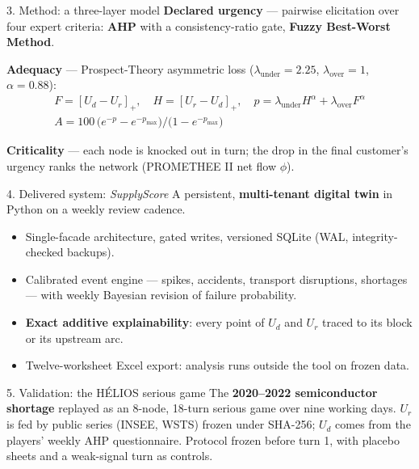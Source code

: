 \documentclass[20pt]{extarticle}
\newcommand{\hl}[1]{\textcolor{altenazure}{\bfseries #1}}
\newcommand{\gap}{\vspace{4mm}}
\begin{document}
\begin{minipage}[t][\textheight][t]{\textwidth}
\begin{minipage}[t]{0.489\linewidth}
\begin{pbox}{3. Method: a three-layer model}
\smallskip
\textbf{Declared urgency} — pairwise elicitation over four expert criteria:
\hl{AHP} with a consistency-ratio gate, \hl{Fuzzy Best-Worst Method}.

\smallskip
\textbf{Adequacy} — Prospect-Theory asymmetric loss
($\lambda_{\text{under}}\!=\!2.25$, $\lambda_{\text{over}}\!=\!1$, $\alpha\!=\!0.88$):
\begin{gather*}
  F=[U_d-U_r]_+,\quad H=[U_r-U_d]_+,\quad
  p=\lambda_{\text{under}}H^{\alpha}+\lambda_{\text{over}}F^{\alpha}\\
  A = 100\,\bigl(e^{-p}-e^{-p_{\max}}\bigr)\big/\bigl(1-e^{-p_{\max}}\bigr)
\end{gather*}

\smallskip
\textbf{Criticality} — each node is knocked out in turn; the drop in the final
customer's urgency ranks the network (PROMETHEE II net flow $\phi$).
\end{pbox}

\gap

\begin{pbox}{4. Delivered system: \emph{SupplyScore}}
A persistent, \hl{multi-tenant digital twin} in Python on a weekly review cadence.
\begin{itemize}
  \item Single-facade architecture, gated writes, versioned SQLite (WAL,
        integrity-checked backups).
  \item Calibrated event engine — spikes, accidents, transport disruptions,
        shortages — with weekly Bayesian revision of failure probability.
  \item \hl{Exact additive explainability}: every point of $U_d$ and $U_r$ traced
        to its block or its upstream arc.
  \item Twelve-worksheet Excel export: analysis runs outside the tool on frozen data.
\end{itemize}
\end{pbox}

\end{minipage}\hfill
\begin{minipage}[t]{0.489\linewidth}
\vspace{0pt}

\begin{pbox}{5. Validation: the HÉLIOS serious game}
The \hl{2020–2022 semiconductor shortage} replayed as an 8-node, 18-turn serious
game over nine working days. $U_r$ is fed by public series (INSEE, WSTS) frozen
under SHA-256; $U_d$ comes from the players' weekly AHP questionnaire. Protocol
frozen before turn 1, with placebo sheets and a weak-signal turn as controls.


\end{pbox}
\end{minipage}
\end{minipage}
\end{document}
